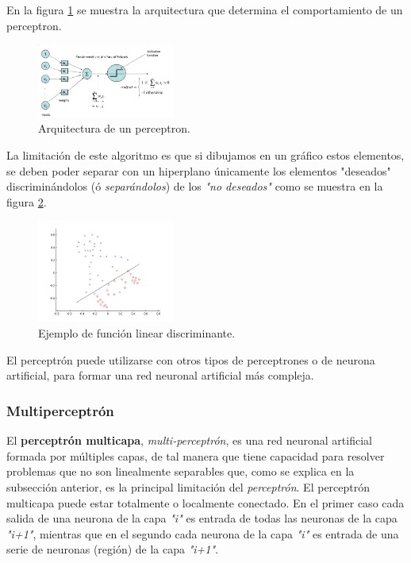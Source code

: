 \documentclass[osajnl,twocolumn,showpacs,superscriptaddress,10pt,floatfix]{revtex4-1} %
\begin{document}
En la figura \ref{figure:perceptron_example} se muestra la arquitectura que determina el comportamiento de un perceptron.

\begin{figure}[H]
    \centering
    \includegraphics[width=0.4\textwidth]{theory/perceptron}
    \caption{Arquitectura de un perceptron.}
    \label{figure:perceptron_example}
\end{figure}

La limitación de este algoritmo es que si dibujamos en un gráfico estos elementos, se deben poder separar con un hiperplano únicamente los elementos "deseados" discriminándolos (ó \textit{separándolos}) de los \textit{"no deseados"} como se muestra en la figura \ref{figure:linear_example}.

\begin{figure}[H]
    \centering
    \includegraphics[width=0.4\textwidth]{theory/linear}
    \caption{Ejemplo de función linear discriminante.}
    \label{figure:linear_example}
\end{figure}

El perceptrón puede utilizarse con otros tipos de perceptrones o de neurona artificial, para formar una red neuronal artificial más compleja.

\subsubsection{Multiperceptrón}

El \textbf{perceptrón multicapa}, \textit{multi-perceptrón}, es una red neuronal artificial formada por múltiples capas, de tal manera que tiene capacidad para resolver problemas que no son linealmente separables que, como se explica en la subsección anterior, es la principal limitación del \textit{perceptrón}. El perceptrón multicapa puede estar totalmente o localmente conectado. En el primer caso cada salida de una neurona de la capa \textit{"i"} es entrada de todas las neuronas de la capa \textit{"i+1"}, mientras que en el segundo cada neurona de la capa \textit{"i"} es entrada de una serie de neuronas (región) de la capa \textit{"i+1"}. \\
\end{document}
